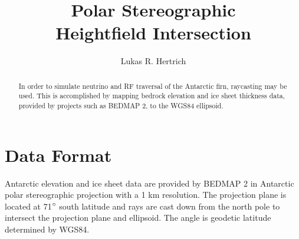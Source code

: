 \documentclass[aps,ams,prl,twocolumn,superscriptaddress]{revtex4-1}
\begin{document}
\pagestyle{headings}

\title{Polar Stereographic\\ Heightfield Intersection}

\author{Lukas R. Hertrich}

\begin{abstract}
In order to simulate neutrino and RF traversal of the Antarctic firn, raycasting may be used. This is accomplished by mapping bedrock elevation and ice sheet thickness
data, provided by projects such as BEDMAP 2, to the WGS84 ellipsoid.
\end{abstract}

\maketitle

\section{Data Format}
Antarctic elevation and ice sheet data are provided by BEDMAP 2 in Antarctic polar stereographic projection with a 1 km resolution.
The projection plane is located at 71$\degree$ south latitude and rays are cast down from the north pole to intersect the projection plane and ellipsoid.
The angle is geodetic latitude determined by WGS84.
\end{document}
